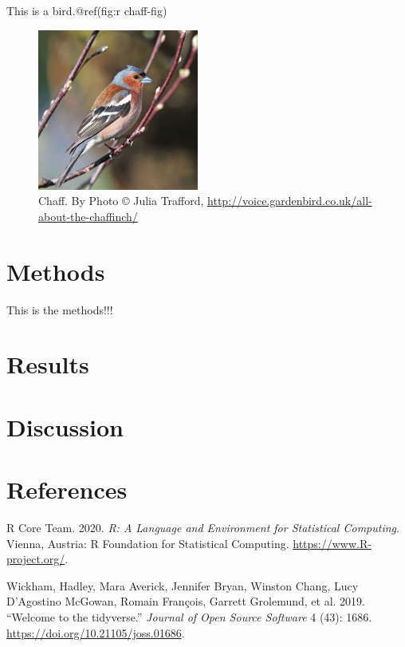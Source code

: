 \documentclass[
]{article}
\begin{document}
This is a bird.@ref(fig:r chaff-fig)



\begin{figure}
\includegraphics[height=200px]{photo} \caption{Chaff. By Photo © Julia Trafford, \url{http://voice.gardenbird.co.uk/all-about-the-chaffinch/}}\label{fig:chaff-fig}
\end{figure}

\hypertarget{methods}{%
\section{Methods}\label{methods}}

This is the methods!!!

\hypertarget{results}{%
\section{Results}\label{results}}

\hypertarget{discussion}{%
\section{Discussion}\label{discussion}}

\hypertarget{references}{%
\section*{References}\label{references}}

\hypertarget{refs}{}
\leavevmode\hypertarget{ref-rcore}{}%
R Core Team. 2020. \emph{R: A Language and Environment for Statistical Computing}. Vienna, Austria: R Foundation for Statistical Computing. \url{https://www.R-project.org/}.

\leavevmode\hypertarget{ref-tidyverse}{}%
Wickham, Hadley, Mara Averick, Jennifer Bryan, Winston Chang, Lucy D'Agostino McGowan, Romain François, Garrett Grolemund, et al. 2019. ``Welcome to the tidyverse.'' \emph{Journal of Open Source Software} 4 (43): 1686. \url{https://doi.org/10.21105/joss.01686}.
\end{document}

